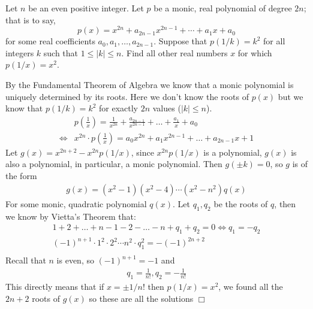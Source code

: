 \begin{problem}[A][9][Putnam 2023 /A2]
    Let $n$ be an even positive integer. Let $p$ be a monic, real polynomial of degree $2n$; that is to say, 
    \[
    p(x) = x^{2n} + a_{2n-1}x^{2n-1} + \cdots + a_1x + a_0
    \]
    for some real coefficients $a_0, a_1, \ldots, a_{2n-1}$. Suppose that $p(1/k) = k^2$ for all integers $k$ such that $1 \leq |k| \leq n$. Find all other real numbers $x$ for which $p(1/x) = x^2$.
\end{problem}

\begin{solution}[$\pm 1/n!$]
    By the Fundamental Theorem of Algebra we know that a monic polynomial is uniquely determined by its roots. Here we don't know the roots of $p(x)$ but we know that $p(1/k)=k^2$ for exactly $2n$ values ($|k| \leq n$). 
    \begin{align*}
        &p \left( \frac{1}{x}\right) = \frac{1}{x^{2n}} + \frac{a_{2n-1}}{x^{2n-1}}+\ldots+ \frac{a_1}{x}+a_0 \\
        \iff &x^{2n} \cdot p\left( \frac{1}{x}\right) = a_0x^{2n}+a_1x^{2n-1}+\ldots+a_{2n-1}x+1 
    \end{align*}
    Let $g(x) = x^{2n+2}-x^{2n}p(1/x)$, since $x^{2n}p(1/x)$ is a polynomial, $g(x)$ is also a polynomial, in particular, a monic polynomial. Then $g(\pm k) = 0$, so $g$ is of the form
    \begin{align*}
        g(x) = (x^2-1)(x^2-4)\cdots(x^2-n^2)q(x)
    \end{align*}
    For some monic, quadratic polynomial $q(x)$. Let $q_1,q_2$ be the roots of $q$, then we know by Vietta's Theorem that:
    \begin{align*}
        1+2+\ldots+n-1-2-\ldots-n +q_1+q_2=0 \iff q_1=-q_2 \\
        (-1)^{n+1}\cdot 1^2 \cdot2^2 \cdots n^2 \cdot q_1^2 = -(-1)^{2n+2} \\
    \end{align*}
    Recall that $n$ is even, so $ (-1)^{n+1}=-1$ and
    \begin{align*}
        q_1 = \frac{1}{n!} , q_2=-\frac{1}{n!}
    \end{align*}
    This directly means that if $x=\pm 1/n!$ then $p(1/x)=x^2$, we found all the $2n+2$ roots of $g(x)$ so these are all the solutions $\Box$
\end{solution}

